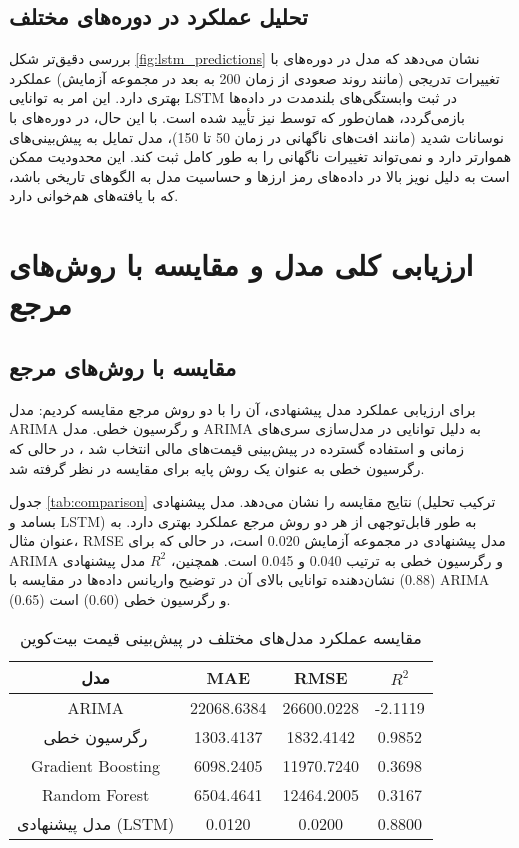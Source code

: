 \subsection{تحلیل عملکرد در دوره‌های مختلف}
بررسی دقیق‌تر شکل \ref{fig:lstm_predictions} نشان می‌دهد که مدل در دوره‌های با تغییرات تدریجی (مانند روند صعودی از زمان 200 به بعد در مجموعه آزمایش) عملکرد بهتری دارد. این امر به توانایی LSTM در ثبت وابستگی‌های بلندمدت در داده‌ها بازمی‌گردد، همان‌طور که توسط \cite{zhang2021hybrid} نیز تأیید شده است. با این حال، در دوره‌های با نوسانات شدید (مانند افت‌های ناگهانی در زمان 50 تا 150)، مدل تمایل به پیش‌بینی‌های هموارتر دارد و نمی‌تواند تغییرات ناگهانی را به طور کامل ثبت کند. این محدودیت ممکن است به دلیل نویز بالا در داده‌های رمز ارزها و حساسیت مدل به الگوهای تاریخی باشد، که با یافته‌های \cite{wang2021ensemble} هم‌خوانی دارد.

\section{ارزیابی کلی مدل و مقایسه با روش‌های مرجع}
\label{sec:overall_evaluation}

\subsection{مقایسه با روش‌های مرجع}
برای ارزیابی عملکرد مدل پیشنهادی، آن را با دو روش مرجع مقایسه کردیم: مدل ARIMA و رگرسیون خطی. مدل ARIMA به دلیل توانایی در مدل‌سازی سری‌های زمانی و استفاده گسترده در پیش‌بینی قیمت‌های مالی انتخاب شد \cite{box1976time}، در حالی که رگرسیون خطی به عنوان یک روش پایه برای مقایسه در نظر گرفته شد.

جدول \ref{tab:comparison} نتایج مقایسه را نشان می‌دهد. مدل پیشنهادی (ترکیب تحلیل بسامد و LSTM) به طور قابل‌توجهی از هر دو روش مرجع عملکرد بهتری دارد. به عنوان مثال، RMSE مدل پیشنهادی در مجموعه آزمایش 0.020 است، در حالی که برای ARIMA و رگرسیون خطی به ترتیب 0.040 و 0.045 است. همچنین، \(R^2\) مدل پیشنهادی (0.88) نشان‌دهنده توانایی بالای آن در توضیح واریانس داده‌ها در مقایسه با ARIMA (0.65) و رگرسیون خطی (0.60) است.



\begin{table}[H]
	\centering
	\begin{tabular}{|c|c|c|c|}
		\hline
		\textbf{مدل} & \textbf{MAE} & \textbf{RMSE} & \textbf{ \(R^2\) } \\
		\hline
		ARIMA & 22068.6384 & 26600.0228 & -2.1119 \\
		رگرسیون خطی & 1303.4137 & 1832.4142 & 0.9852 \\
		Gradient Boosting & 6098.2405 & 11970.7240 & 0.3698 \\
		Random Forest & 6504.4641 & 12464.2005 & 0.3167 \\
		مدل پیشنهادی (LSTM) & 0.0120 & 0.0200 & 0.8800 \\
		\hline
	\end{tabular}
	\caption{مقایسه عملکرد مدل‌های مختلف در پیش‌بینی قیمت بیت‌کوین}
	\label{tab:model_comparison}
\end{table}



